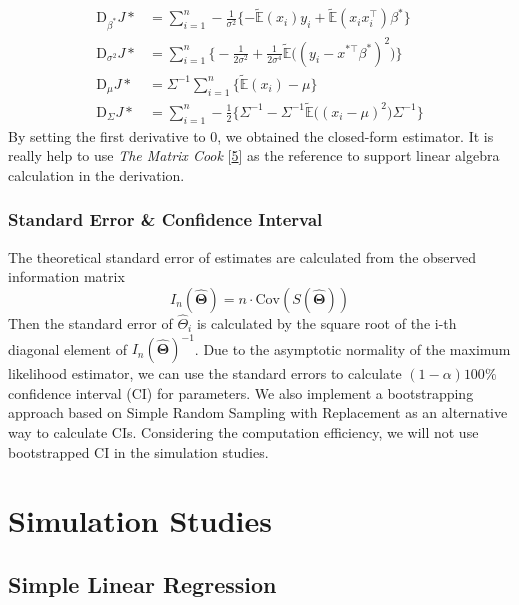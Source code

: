 \documentclass[
  twocolumn]{article}
\begin{document}
\[
\begin{aligned}
\boldsymbol{\mathrm{D}}_{{\beta}^{*}}J* &= 
\sum_{i=1}^{n} - \frac{1}{\sigma^2} \{-\tilde{\mathbb{E}}(x_i)y_i + \tilde{\mathbb{E}}(x_ix_i^{\top})\beta^{*}\} \\
\boldsymbol{\mathrm{D}}_{{\sigma}^2}J* &=
\sum_{i=1}^{n} \Big\{ - \frac{1}{2\sigma^2} + \frac{1}{2\sigma^4} \tilde{\mathbb{E}}\big((y_i-x^{*\top}\beta^{*})^2\big) \Big\}\\
\boldsymbol{\mathrm{D}}_{\mu}J* &= \Sigma^{-1} \sum_{i=1}^{n} \Big\{\tilde{\mathbb{E}}(x_i) - \mu \Big\}\\
\boldsymbol{\mathrm{D}}_{\Sigma}J* &= 
\sum_{i=1}^{n} -\frac{1}{2} \Big\{ \Sigma^{-1} - \Sigma^{-1} \tilde{\mathbb{E}}\big((x_i-\mu)^2\big) \Sigma^{-1} \Big\}
\end{aligned}
\] By setting the first derivative to 0, we obtained the closed-form
estimator. It is really help to use \emph{The Matrix Cook}
{[}\protect\hyperlink{ref-petersen2008matrix}{5}{]} as the reference to
support linear algebra calculation in the derivation.

\hypertarget{standard-error-confidence-interval}{%
\subsubsection{Standard Error \& Confidence
Interval}\label{standard-error-confidence-interval}}

The theoretical standard error of estimates are calculated from the
observed information matrix \[ 
I_n (\hat{\boldsymbol{\Theta}}) = n \cdot \mathrm{Cov}(S(\hat{\boldsymbol{\Theta}}))
\] Then the standard error of \(\hat\Theta_i\) is calculated by the
square root of the i-th diagonal element of
\(I_n(\hat{\boldsymbol{\Theta}})^{-1}\). Due to the asymptotic normality
of the maximum likelihood estimator, we can use the standard errors to
calculate \((1-\alpha)100\%\) confidence interval (CI) for parameters.
We also implement a bootstrapping approach based on Simple Random
Sampling with Replacement as an alternative way to calculate CIs.
Considering the computation efficiency, we will not use bootstrapped CI
in the simulation studies.

\hypertarget{simulation-studies}{%
\section{Simulation Studies}\label{simulation-studies}}

\hypertarget{simple-linear-regression}{%
\subsection{Simple Linear Regression}\label{simple-linear-regression}}
\end{document}
